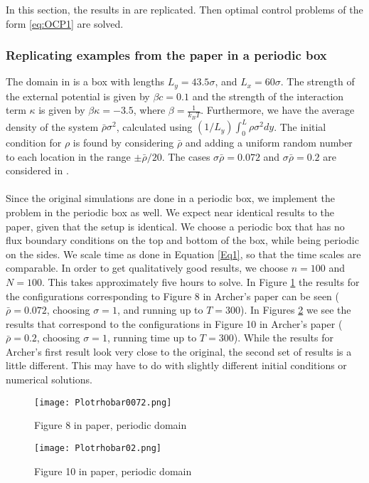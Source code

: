 In this section, the results in \cite{ArcherSed1} are replicated. Then optimal control problems of the form \eqref{eq:OCP1} are solved.



\subsubsection{Replicating examples from the paper in a periodic box}
The domain in \cite{ArcherSed1} is a box with lengths $L_y = 43.5 \sigma$, and $L_x = 60 \sigma$. 
The strength of the external potential is given by $\beta c = 0.1$ and the strength of the interaction term $\kappa$ is given by $\beta \kappa = - 3.5$, where $\beta = \frac{1}{k_BT}$. 
Furthermore, we have the average density of the system $\bar \rho \sigma^2$, calculated using $(1/L_y)\int_0^L \rho \sigma^2 dy$.
The initial condition for $\rho$ is found by considering $\bar \rho$ and adding a uniform random number to each location in the range $\pm \bar \rho/ 20$. The cases $\sigma \bar \rho = 0.072$ and $\sigma \bar \rho = 0.2$ are considered in \cite{ArcherSed1}.
\\
\\
Since the original simulations are done in a periodic box, we implement the problem in the periodic box as well. We expect near identical results to the paper, given that the setup is identical.
We choose a periodic box that has no flux boundary conditions on the top and bottom of the box, while being periodic on the sides. 
We scale time as done in Equation \eqref{Eq1}, so that the time scales are comparable. In order to get qualitatively good results, we choose $n =100$ and $N = 100$. This takes approximately five hours to solve. In Figure \ref{F5} the results for the configurations corresponding to Figure 8 in Archer's paper can be seen ($ \bar \rho = 0.072$, choosing $\sigma = 1$, and running up to $T = 300$). In Figures \ref{F7} we see the results that correspond to the configurations in Figure 10 in Archer's paper ($ \bar \rho = 0.2$, choosing $\sigma = 1$, running time up to $T = 300$). While the results for Archer's first result look very close to the original, the second set of results is a little different. This may have to do with slightly different initial conditions or numerical solutions.


\begin{figure}[h]
	\centering
	\texttt{[image: Plotrhobar0072.png]}
	\caption{Figure 8 in paper, periodic domain} 
	\label{F5}
\end{figure}
\begin{figure}[h]
	\centering
	\texttt{[image: Plotrhobar02.png]}
	\caption{Figure 10 in paper, periodic domain} 
	\label{F7}
\end{figure}



